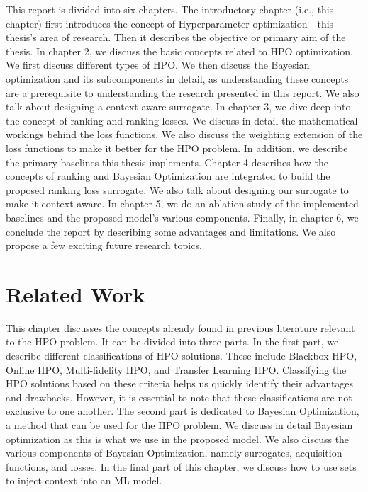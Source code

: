 \documentclass[12pt, twoside, ngerman]{report}
\begin{document}
This report is divided into six chapters. The introductory chapter (i.e., this chapter) first introduces the concept of Hyperparameter optimization - this thesis's area of research. Then it describes the objective or primary aim of the thesis. In chapter 2, we discuss the basic concepts related to HPO optimization. We first discuss different types of HPO. We then discuss the Bayesian optimization and its subcomponents in detail, as understanding these concepts are a prerequisite to understanding the research presented in this report. We also talk about designing a context-aware surrogate. In chapter 3, we dive deep into the concept of ranking and ranking losses. We discuss in detail the mathematical workings behind the loss functions. We also discuss the weighting extension of the loss functions to make it better for the HPO problem. In addition, we describe the primary baselines this thesis implements. Chapter 4 describes how the concepts of ranking and Bayesian Optimization are integrated to build the proposed ranking loss surrogate. We also talk about designing our surrogate to make it context-aware. In chapter 5, we do an ablation study of the implemented baselines and the proposed model's various components. Finally, in chapter 6, we conclude the report by describing some advantages and limitations. We also propose a few exciting future research topics.


\chapter{Related Work}\label{chap:relatedWork}

This chapter discusses the concepts already found in previous literature relevant to the HPO problem. It can be divided into three parts.
In the first part, we describe different classifications of HPO solutions. These include Blackbox HPO, Online HPO, Multi-fidelity HPO, and Transfer Learning HPO. Classifying the HPO solutions based on these criteria helps us quickly identify their advantages and drawbacks. However, it is essential to note that these classifications are not exclusive to one another. 
The second part is dedicated to Bayesian Optimization, a method that can be used for the HPO problem. We discuss in detail Bayesian optimization as this is what we use in the proposed model. We also discuss the various components of Bayesian Optimization, namely surrogates, acquisition functions, and losses.
In the final part of this chapter, we discuss how to use sets to inject context into an ML model.
\end{document}
